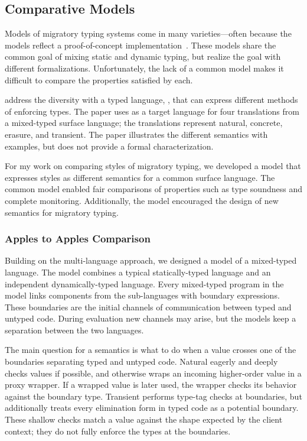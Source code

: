 \subsection{Comparative Models}

Models of migratory typing systems come in many varieties---often because
 the models reflect a proof-of-concept implementation~\cite{bat-ecoop-2014,wnlov-popl-2010,mt-oopsla-2017,vss-popl-2017,tf-popl-2008}.
These models share the common goal of mixing static and dynamic typing,
 but realize the goal with different formalizations.
Unfortunately, the lack of a common model makes it difficult to compare the
 properties satisfied by each.

\citet{clzv-ecoop-2018} address the diversity with a typed language, \kafka{},
 that can express different methods of enforcing types.
The paper uses \kafka{} as a target language for four translations from
 a mixed-typed surface language; the translations represent natural,
 concrete, erasure, and transient.
The paper illustrates the different semantics with examples, but does not
 provide a formal characterization.

For my work on comparing styles of migratory typing, we developed
 a model that expresses styles as different semantics
 for a common surface language.
The common model enabled fair comparisons of properties
 such as type soundness and complete monitoring.
Additionally, the model encouraged the design of new semantics for migratory
 typing.


\subsubsection{Apples to Apples Comparison}


Building on the \citet{mf-toplas-2009} multi-language approach, we designed
 a model of a mixed-typed language.
The model combines a typical statically-typed language and an independent
 dynamically-typed language.
Every mixed-typed program in the model links components from the sub-languages
 with boundary expressions.
These boundaries are the initial channels of communication between typed and
 untyped code.
During evaluation new channels may arise, but the models keep a separation
 between the two languages.

The main question for a semantics is what to do when a value crosses one
 of the boundaries separating typed and untyped code.
Natural eagerly and deeply checks values if possible, and otherwise wraps
 an incoming higher-order value in a proxy wrapper.
If a wrapped value is later used, the wrapper checks its behavior against
 the boundary type.
Transient performs type-tag checks at boundaries, but additionally
 treats every elimination form in typed code as a potential boundary.
These shallow checks match a value against the shape expected by the
 client context; they do not fully enforce the types at the boundaries.

